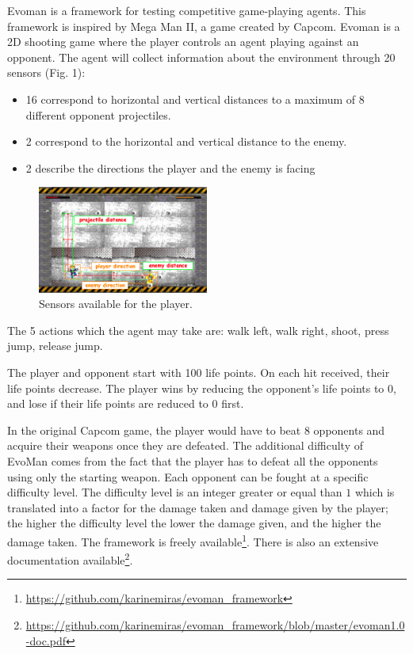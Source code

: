 \documentclass[conference]{IEEEtran}
\begin{document}
    Evoman\cite{karinemiras,evoman} is a framework for testing competitive game-playing agents.
    This framework is inspired by Mega Man II\cite{capcom}, a game created by Capcom.
    Evoman is a 2D shooting game where the player controls an agent playing against an opponent.
    The agent will collect information about the environment through 20 sensors (Fig. 1):
    \begin{itemize}
        \item 16 correspond to horizontal and vertical distances to a maximum of 8 different opponent projectiles.
        \item 2 correspond to the horizontal and vertical distance to the enemy.
        \item 2 describe the directions the player and the enemy is facing
    \end{itemize}
    \begin{figure}
        \centering
        \includegraphics[width=0.5\textwidth]{images/Evoman3.png}
        \caption{Sensors available for the player\cite{evoman}.}
        \label{fig:sensors}
    \end{figure}
    The 5 actions which the agent may take are: walk left, walk right, shoot, press jump, release jump.

    The player and opponent start with 100 life points. On each hit received, their life points decrease.
    The player wins by reducing the opponent's life points to $0$, and lose if their life points are reduced to $0$ first.

    In the original Capcom game, the player would have to beat $8$ opponents and acquire their weapons
    once they are defeated.
    The additional difficulty of EvoMan comes from the fact that the player has to defeat all
    the opponents using only the starting weapon.
    Each opponent can be fought at a specific difficulty level.
    The difficulty level is an integer greater or equal than $1$ which is translated into a factor for the damage
    taken and damage given by the player; the higher the difficulty level the lower the damage given, and the higher the damage taken.
    The framework is freely available\footnote{\url{https://github.com/karinemiras/evoman_framework}}.
    There is also an extensive documentation
    available\footnote{\url{https://github.com/karinemiras/evoman_framework/blob/master/evoman1.0-doc.pdf}}.
\end{document}
